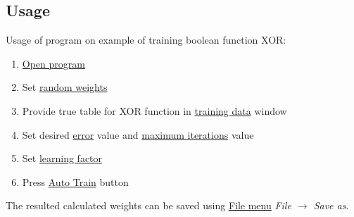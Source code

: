 \newpage

\subsection{Usage}
\label{Usage}

Usage of program on example of training boolean function XOR:
\begin{enumerate}[topsep=8pt,itemsep=-1ex,partopsep=1ex,parsep=1ex]
    \item \hyperref[UserInterface]{Open program}
    \item Set \hyperref[RandomWeight]{random weights}
    \item Provide true table for XOR function in \hyperref[TrainingData]{training data} window
    \item Set desired \hyperref[Error]{error} value and \hyperref[MaxSteps]{maximum iterations} value
    \item Set \hyperref[TrainCoef]{learning factor}
    \item Press \hyperref[AutoTrain]{Auto Train} button
\end{enumerate}

The resulted calculated weights can be saved using \hyperref[FileMenu]{File menu} \textit{File $\rightarrow$ Save as}.